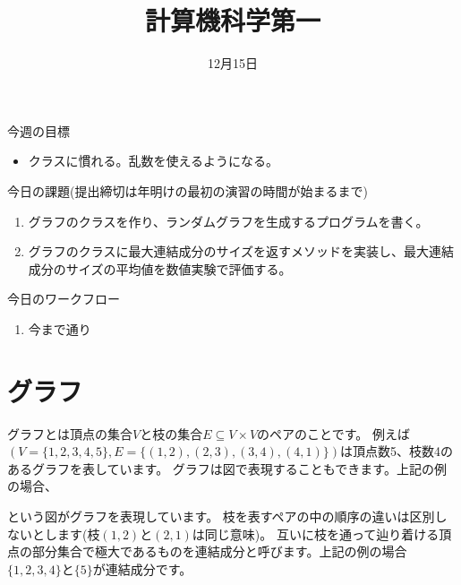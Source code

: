 \documentclass[a4paper,twoside,onecolumn,openany,article]{memoir}
\title{計算機科学第一}
\date{12月15日}
\theoremstyle{remark}
\begin{document}
\maketitle

\noindent
今週の目標
\begin{itemize}
\item クラスに慣れる。乱数を使えるようになる。
\end{itemize}

\noindent
今日の課題(提出締切は年明けの最初の演習の時間が始まるまで)
\begin{enumerate}
\item 
グラフのクラスを作り、ランダムグラフを生成するプログラムを書く。
\item
グラフのクラスに最大連結成分のサイズを返すメソッドを実装し、最大連結成分のサイズの平均値を数値実験で評価する。
\end{enumerate}

\noindent
今日のワークフロー
\begin{enumerate}
\item 今まで通り
\end{enumerate}

\section{グラフ}
グラフとは頂点の集合$V$と枝の集合$E\subseteq V\times V$のペアのことです。
例えば$(V=\{1,2,3,4, 5\}, E=\{(1,2),(2,3),(3,4),(4,1)\})$は頂点数5、枝数4のあるグラフを表しています。
グラフは図で表現することもできます。上記の例の場合、

\begin{center}
\end{center}
という図がグラフを表現しています。
枝を表すペアの中の順序の違いは区別しないとします(枝$(1,2)$と$(2,1)$は同じ意味)。
互いに枝を通って辿り着ける頂点の部分集合で極大であるものを連結成分と呼びます。上記の例の場合$\{1,2,3,4\}$と$\{5\}$が連結成分です。
 
\end{document}
